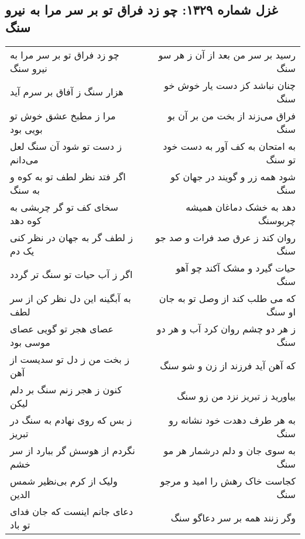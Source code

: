 \begin{center}
\section*{غزل شماره ۱۳۲۹: چو زد فراق تو بر سر مرا به نیرو سنگ}
\label{sec:1329}
\begin{longtable}{l p{0.5cm} r}
چو زد فراق تو بر سر مرا به نیرو سنگ
&&
رسید بر سر من بعد از آن ز هر سو سنگ
\\
هزار سنگ ز آفاق بر سرم آید
&&
چنان نباشد کز دست یار خوش خو سنگ
\\
مرا ز مطبخ عشق خوش تو بویی بود
&&
فراق می‌زند از بخت من بر آن بو سنگ
\\
ز دست تو شود آن سنگ لعل می‌دانم
&&
به امتحان به کف آور به دست خود تو سنگ
\\
اگر فتد نظر لطف تو به کوه و به سنگ
&&
شود همه زر و گویند در جهان کو سنگ
\\
سخای کف تو گر چربشی به کوه دهد
&&
دهد به خشک دماغان همیشه چربوسنگ
\\
ز لطف گر به جهان در نظر کنی یک دم
&&
روان کند ز عرق صد فرات و صد جو سنگ
\\
اگر ز آب حیات تو سنگ تر گردد
&&
حیات گیرد و مشک آکند چو آهو سنگ
\\
به آبگینه این دل نظر کن از سر لطف
&&
که می طلب کند از وصل تو به جان او سنگ
\\
عصای هجر تو گویی عصای موسی بود
&&
ز هر دو چشم روان کرد آب و هر دو سنگ
\\
ز بخت من ز دل تو سدیست از آهن
&&
که آهن آید فرزند از زن و شو سنگ
\\
کنون ز هجر زنم سنگ بر دلم لیکن
&&
بیاورید ز تبریز نزد من زو سنگ
\\
ز بس که روی نهادم به سنگ در تبریز
&&
به هر طرف دهدت خود نشانه رو سنگ
\\
نگردم از هوسش گر ببارد از سر خشم
&&
به سوی جان و دلم درشمار هر مو سنگ
\\
ولیک از کرم بی‌نظیر شمس الدین
&&
کجاست خاک رهش را امید و مرجو سنگ
\\
دعای جانم اینست که جان فدای تو باد
&&
وگر زنند همه بر سر دعاگو سنگ
\\
\end{longtable}
\end{center}
